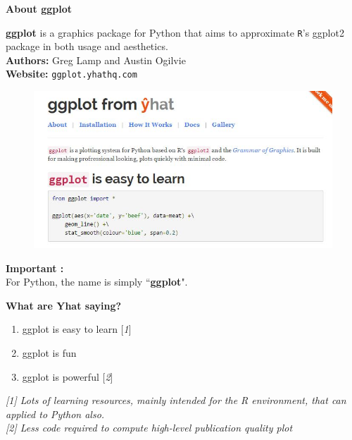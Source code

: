 \documentclass{beamer}
\begin{document}

\begin{frame}
	\Large
	\noindent\textbf{About ggplot}
	\bigskip
	
	\textbf{ggplot} is a graphics package for Python that aims to approximate \texttt{R}'s ggplot2 package in both usage and aesthetics.\\
	\bigskip
	\textbf{Authors:} Greg Lamp and Austin Ogilvie\\
	\bigskip
	\textbf{Website:} \texttt{ggplot.yhathq.com}
\end{frame}


\begin{frame}
	\begin{figure}
		\centering
		\includegraphics[width=1.1\linewidth]{ggplot-yhat}
	\end{figure}
	\Large
	\noindent \textbf{Important :} \\ For Python, the name is simply ``\textbf{ggplot}".
\end{frame}
\begin{frame}
	\Large
	\noindent\textbf{What are Yhat saying?}
	
	\begin{enumerate}
		\item ggplot is easy to learn [\textit{1}]
		\item ggplot is fun
		\item ggplot is powerful [\textit{2}]
	\end{enumerate}
	
	\begin{framed}
		\textit{[1] Lots of learning resources, mainly intended for the R environment, that can applied to Python also.}\\
		\bigskip
		\textit{[2] Less code required to compute high-level publication quality plot}
	\end{framed}
\end{frame}	
\end{document}
